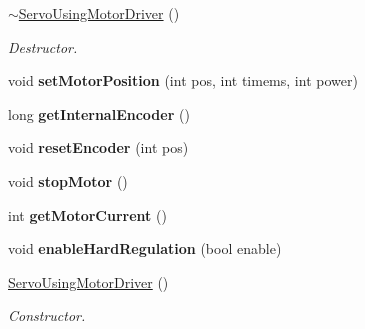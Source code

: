 \begin{DoxyCompactItemize}
\mbox{\label{classServoUsingMotorDriver_a8aa604a17555514d3ddf78e15f467faf}} 
\hyperlink{classServoUsingMotorDriver_a8aa604a17555514d3ddf78e15f467faf}{$\sim$\+Servo\+Using\+Motor\+Driver} ()
\begin{DoxyCompactList}\small\item\em Destructor. \end{DoxyCompactList}\item 
\mbox{\label{classServoUsingMotorDriver_a9569643c48ac9d6c1936e8562825e280}} 
void {\bfseries set\+Motor\+Position} (int pos, int timems, int power)
\item 
\mbox{\label{classServoUsingMotorDriver_a64c62fd0ecb287fe45770c387e394eac}} 
long {\bfseries get\+Internal\+Encoder} ()
\item 
\mbox{\label{classServoUsingMotorDriver_acf78dbe83df0a7744fd40920a6388efd}} 
void {\bfseries reset\+Encoder} (int pos)
\item 
\mbox{\label{classServoUsingMotorDriver_a58fbf805d7bb382b505ea634e6bcbb08}} 
void {\bfseries stop\+Motor} ()
\item 
\mbox{\label{classServoUsingMotorDriver_ad76b35929d55c4249c5e7c3818c053b6}} 
int {\bfseries get\+Motor\+Current} ()
\item 
\mbox{\label{classServoUsingMotorDriver_adeb6e60d59bac919b7dc45c6f4a4f32c}} 
void {\bfseries enable\+Hard\+Regulation} (bool enable)
\item 
\mbox{\label{classServoUsingMotorDriver_acc8ccf92143efa853b83940d2d690817}} 
\hyperlink{classServoUsingMotorDriver_acc8ccf92143efa853b83940d2d690817}{Servo\+Using\+Motor\+Driver} ()
\begin{DoxyCompactList}\small\item\em Constructor. \end{DoxyCompactList}\item 
\mbox{\label{classServoUsingMotorDriver_a8aa604a17555514d3ddf78e15f467faf}} 

\end{DoxyCompactItemize}
